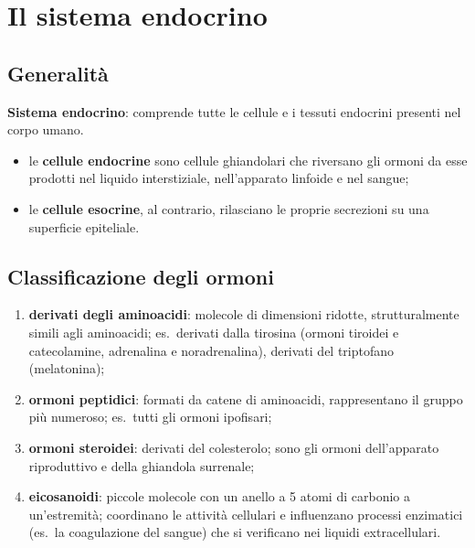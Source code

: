 \chapter{Il sistema endocrino}

\section{Generalità}

\textbf{Sistema endocrino}: comprende tutte le cellule e i tessuti endocrini
presenti nel corpo umano.

\begin{itemize}
  \item le \textbf{cellule endocrine} sono cellule ghiandolari che riversano
    gli ormoni da esse prodotti nel liquido interstiziale, nell'apparato
    linfoide e nel sangue;
  \item le \textbf{cellule esocrine}, al contrario, rilasciano le proprie
    secrezioni su una superficie epiteliale.
\end{itemize}

\section{Classificazione degli ormoni}

\begin{enumerate}
  \item \textbf{derivati degli aminoacidi}: molecole di dimensioni ridotte,
    strutturalmente simili agli aminoacidi; es.\ derivati dalla tirosina
    (ormoni tiroidei e catecolamine, adrenalina e noradrenalina), derivati
    del triptofano (melatonina);
  \item \textbf{ormoni peptidici}: formati da catene di aminoacidi,
    rappresentano il gruppo più numeroso; es.\ tutti gli ormoni ipofisari;
  \item \textbf{ormoni steroidei}: derivati del colesterolo; sono gli ormoni
    dell'apparato riproduttivo e della ghiandola surrenale;
  \item \textbf{eicosanoidi}: piccole molecole con un anello a 5 atomi di
    carbonio a un'estremità; coordinano le attività cellulari e influenzano
    processi enzimatici (es.\ la coagulazione del sangue) che si verificano
    nei liquidi extracellulari.
\end{enumerate}

